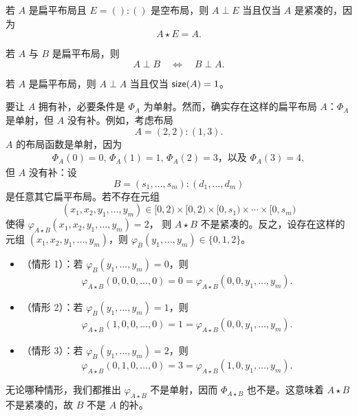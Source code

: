 \begin{example}
    若 $A$ 是扁平布局且 $E = ():()$ 是空布局，则 $A \perp E$ 当且仅当 $A$ 是紧凑的，因为
    \[
    A \star E = A.
    \]
\end{example}

\begin{example}
    若 $A$ 与 $B$ 是扁平布局，则
    \[A \perp B \quad \Leftrightarrow \quad B \perp A.\]
\end{example}

\begin{example}
    若 $A$ 是扁平布局，则 $A\perp A$ 当且仅当 $\mathsf{size}(A) = 1$。
\end{example}

\begin{observation}
    要让 $A$ 拥有补，必要条件是 $\Phi_A$ 为单射。然而，确实存在这样的扁平布局 $A$：$\Phi_A$ 是单射，但 $A$ 没有补。例如，考虑布局
    \[
    A = (2,2):(1,3).
    \]
    $A$ 的布局函数是单射，因为
    \begin{align*}
    \Phi_A(0) = 0\text{, }\Phi_A(1) = 1\text{, } \Phi_A(2) = 3\text{，以及 }\Phi_A(3) = 4,
    \end{align*}
    但 $A$ 没有补：设
    \[
    B = (s_1,\dots,s_m):(d_1,\dots,d_m)
    \]
    是任意其它扁平布局。若不存在元组
    \[
    (x_1,x_2,y_1,\dots,y_m) \in [0,2) \times [0,2) \times [0,s_1) \times \cdots \times  [0,s_m)
    \]
    使得 $\varphi_{A \star B}(x_1,x_2,y_1,\dots,y_m) = 2$，
    则 $A \star B$ 不是紧凑的。反之，设存在这样的元组 $(x_1,x_2,y_1,\dots,y_m)$，则 $\varphi_{B}(y_1,\dots,y_m) \in \{0,1,2\}$。
    \begin{itemize}
        \item （情形 1）：若 $\varphi_{B}(y_1,\dots,y_m) = 0$，则
        \begin{align*}
        \varphi_{A \star B}(0,0,0,\dots,0) = 0 = \varphi_{A \star B}(0,0,y_1,\dots,y_m).
        \end{align*}
        \item （情形 2）：若 $\varphi_{B}(y_1,\dots,y_m) = 1$，则
        \begin{align*}
        \varphi_{A \star B}(1,0,0,\dots,0) = 1 = \varphi_{A \star B}(0,0,y_1,\dots,y_m).
        \end{align*}
        \item （情形 3）：若 $\varphi_{B}(y_1,\dots,y_m) = 2$，则
        \[
        \varphi_{A \star B}(0,1,0,\dots,0) = 3 = \varphi_{A \star B}(1,0,y_1,\dots,y_m).
        \]
    \end{itemize}
    无论哪种情形，我们都推出 $\varphi_{A\star B}$ 不是单射，因而 $\Phi_{A \star B}$ 也不是。这意味着 $A \star B$ 不是紧凑的，故 $B$ 不是 $A$ 的补。
\end{observation}

